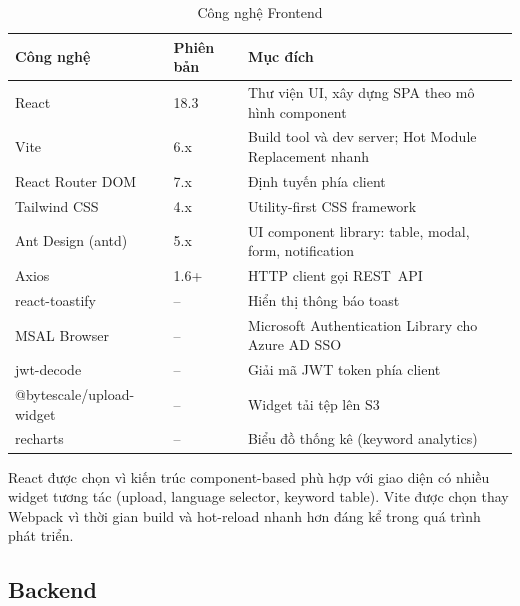 \begin{table}[H]
\centering
\caption{Công nghệ Frontend}
\label{tab:tech_fe}
\renewcommand{\arraystretch}{1.3}
\begin{tabularx}{\textwidth}{|l|l|X|}
\hline
\textbf{Công nghệ} & \textbf{Phiên bản} & \textbf{Mục đích} \\
\hline
React              & 18.3              & Thư viện UI, xây dựng SPA theo mô hình component \\
\hline
Vite               & 6.x               & Build tool và dev server; Hot Module Replacement nhanh \\
\hline
React Router DOM   & 7.x               & Định tuyến phía client \\
\hline
Tailwind CSS       & 4.x               & Utility-first CSS framework \\
\hline
Ant Design (antd)  & 5.x               & UI component library: table, modal, form, notification \\
\hline
Axios              & 1.6+              & HTTP client gọi REST~API \\
\hline
react-toastify     & --                & Hiển thị thông báo toast \\
\hline
MSAL Browser       & --                & Microsoft Authentication Library cho Azure AD SSO \\
\hline
jwt-decode         & --                & Giải mã JWT token phía client \\
\hline
@bytescale/upload-widget & --         & Widget tải tệp lên S3 \\
\hline
recharts           & --                & Biểu đồ thống kê (keyword analytics) \\
\hline
\end{tabularx}
\end{table}

React được chọn vì kiến trúc component-based phù hợp với giao diện có nhiều widget tương tác (upload, language selector, keyword table). Vite được chọn thay Webpack vì thời gian build và hot-reload nhanh hơn đáng kể trong quá trình phát triển.

\subsection{Backend}

